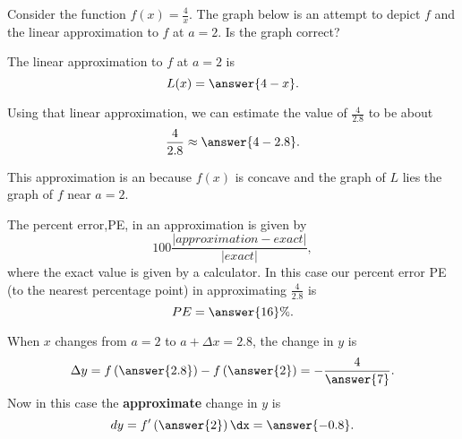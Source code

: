 \documentclass{ximera}
\author{Nela Lakos \and Kyle Parsons}
\begin{document}
\begin{exercise}

Consider the function $f(x) = \frac{4}{x}$.  The graph below is an attempt to depict $f$ and the linear approximation to $f$ at $a=2$. Is the graph correct?
\begin{multipleChoice}
\end{multipleChoice}

\begin{image}
\end{image}

The linear approximation to $f$ at $a=2$ is
\[
L(x) = \answer{4-x}.
\]

Using that linear approximation, we can estimate the value of $\frac{4}{2.8}$ to be about
\[
\frac{4}{2.8} \approx \answer{4-2.8}.
\]

This approximation is an  because $f(x)$ is concave  and the graph of $L$ lies  the graph of $f$ near $a=2$.

The percent error,PE, in an approximation is given by
\[
100\frac{|approximation - exact|}{|exact|},
\]
where the exact value is given by a calculator.  In this case our percent error PE (to the nearest percentage point) in approximating $\frac{4}{2.8}$ is
\[
PE= \answer{16}\%.
\]

When $x$ changes from $a=2$ to $a+\Delta x = 2.8$, the change in $y$ is 
\[
\Delta y = f\left(\answer{2.8}\right) - f\left(\answer{2}\right) = -\frac{4}{\answer{7}}.
\]
Now in this case the \textbf{approximate} change in $y$ is
\[
dy = f'\left(\answer{2}\right)\dx = \answer{-0.8}.
\]


\end{exercise}
\end{document}
